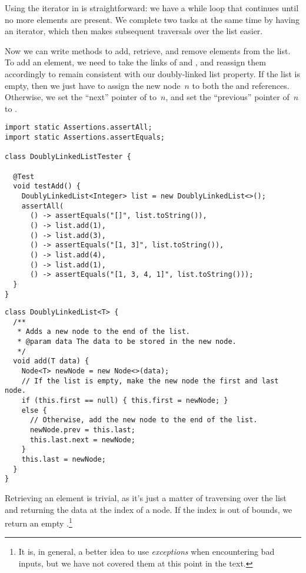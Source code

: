 Using the iterator in  is straightforward: we have a while loop that continues until no more elements are present. We complete two tasks at the same time by having an iterator, which then makes subsequent traversals over the list easier.

Now we can write methods to add, retrieve, and remove elements from the list. To add an element, we need to take the links of  and , and reassign them accordingly to remain consistent with our doubly-linked list property. If the list is empty, then we just have to assign the new node~$n$ to both the  and  references. Otherwise, we set the ``next'' pointer of  to~$n$, and set the ``previous'' pointer of~$n$ to . 

\begin{lstlisting}[language=MyJava]
import static Assertions.assertAll;
import static Assertions.assertEquals;

class DoublyLinkedListTester {

  @Test
  void testAdd() {
    DoublyLinkedList<Integer> list = new DoublyLinkedList<>();
    assertAll(
      () -> assertEquals("[]", list.toString()),
      () -> list.add(1),
      () -> list.add(3),
      () -> assertEquals("[1, 3]", list.toString()),
      () -> list.add(4),
      () -> list.add(1),
      () -> assertEquals("[1, 3, 4, 1]", list.toString()));
  }
}
\end{lstlisting}

\begin{lstlisting}[language=MyJava]
class DoublyLinkedList<T> {
  /**
   * Adds a new node to the end of the list.
   * @param data The data to be stored in the new node.
   */
  void add(T data) {
    Node<T> newNode = new Node<>(data);
    // If the list is empty, make the new node the first and last node.
    if (this.first == null) { this.first = newNode; } 
    else {
      // Otherwise, add the new node to the end of the list.
      newNode.prev = this.last;
      this.last.next = newNode;
    }
    this.last = newNode;
  }
}
\end{lstlisting}

Retrieving an element is trivial, as it's just a matter of traversing over the list and returning the data at the index of a node. If the index is out of bounds, we return an empty .\footnote{It is, in general, a better idea to use \emph{exceptions} when encountering bad inputs, but we have not covered them at this point in the text.}

